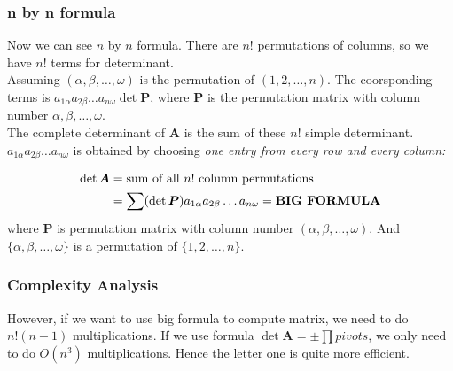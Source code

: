 \subsubsection{n by n formula}
Now we can see $n$ by $n$ formula. There are $n!$ permutations of columns, so we have $n!$ terms for determinant. \\
Assuming $(\alpha,\beta,\dots,\omega)$ is the permutation of $(1,2,\dots,n)$. The coorsponding terms is $a_{1\alpha}a_{2\beta}\dots a_{n\omega}\det\bm P$, where $\bm P$ is the permutation matrix with column number $\alpha,\beta,\dots,\omega$.\\
The complete determinant of $\bm A$ is the sum of these $n!$ simple determinant. $a_{1\alpha}a_{2\beta}\dots a_{n\omega}$ is obtained by choosing \emph{one entry from every row and every column:}
\begin{definition}
\[
\begin{aligned}
\det\bm A&=\text{sum of all $n!$ column permutations}\\
&=\sum(\det\bm P)a_{1\alpha}a_{2\beta}\dots a_{n\omega}=\text{\textbf{BIG FORMULA}}
\end{aligned}
\]
where $\bm P$ is permutation matrix with column number $(\alpha,\beta,\dots,\omega)$. And $\{\alpha,\beta,\dots,\omega\}$ is a permutation of $\{1,2,\dots,n\}$.
\end{definition}
\begin{remark}
\subsubsection{Complexity Analysis}
However, if we want to use big formula to compute matrix, we need to do $n!(n-1)$ multiplications. If we use formula $\det\bm A=\pm\prod pivots$, we only need to do $O(n^3)$ multiplications. Hence the letter one is quite more efficient.
\end{remark}
